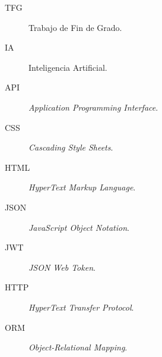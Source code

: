 \documentclass[a4paper,12pt,twoside]{memoir}
\begin{document}
\begin{description}
	\item[TFG] Trabajo de Fin de Grado.
	\item[IA] Inteligencia Artificial.
	\item[API] \textit{Application Programming Interface}.
	\item[CSS] \textit{Cascading Style Sheets}.
	\item[HTML] \textit{HyperText Markup Language}.
	\item[JSON] \textit{JavaScript Object Notation}.
	\item[JWT] \textit{JSON Web Token}.
	\item[HTTP] \textit{HyperText Transfer Protocol}.
	\item[ORM] \textit{Object-Relational Mapping}.
\end{description}

\clearpage

\mainmatter











\end{document}
